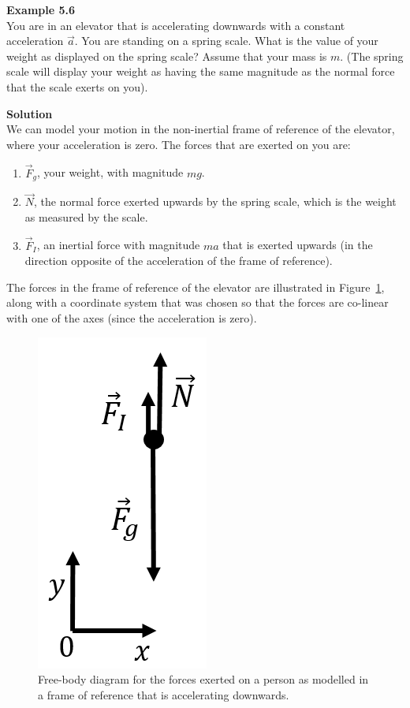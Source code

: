 \begin{framed}
\textbf{Example 5.6}\\
You are in an elevator that is accelerating downwards with a constant acceleration $\vec a$. You are standing on a spring scale. What is the value of your weight as displayed on the spring scale? Assume that your mass is $m$. (The spring scale will display your weight as having the same magnitude as the normal force that the scale exerts on you).

\begin{framed}
\textbf{Solution}\\
We can model your motion in the non-inertial frame of reference of the elevator, where your acceleration is zero. The forces that are exerted on you are:

\begin{enumerate}
\item $\vec F_g$, your weight, with magnitude $mg$.
\item $\vec N$, the normal force exerted upwards by the spring scale, which is the weight as measured by the scale.
\item $\vec F_I$, an inertial force with magnitude $ma$ that is exerted upwards (in the direction opposite of the acceleration of the frame of reference).
\end{enumerate}

The forces in the frame of reference of the elevator are illustrated in Figure~\ref{fig:newtonslaws:elevator_fbd}, along with a coordinate system that was chosen so that the forces are co-linear with one of the axes (since the acceleration is zero).

\begin{figure}[!htbp]
\centering
\includegraphics[width=0.2\linewidth]{files/elevator_fbd-02a9d537db0b0d02f41808025e78d38d.png}
\caption[]{Free-body diagram for the forces exerted on a person as modelled in a frame of reference that is accelerating downwards.}
\label{fig:newtonslaws:elevator_fbd}
\end{figure}


\end{framed}
\end{framed}
